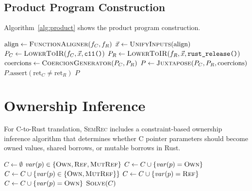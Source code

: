 \documentclass[11pt,a4paper]{article}
\begin{document}
\begin{appendices}
\subsection{Product Program Construction}

Algorithm~\ref{alg:product} shows the product program construction.

\begin{algorithm}[h]
\caption{Product Program Construction}\label{alg:product}
\begin{algorithmic}[1]
  \State $\text{align} \gets \Call{FunctionAligner}{f_C, f_R}$
  \State $\vec{x} \gets \Call{UnifyInputs}{\text{align}}$
  \State $P_C \gets \Call{LowerToIR}{f_C, \vec{x}, \texttt{c11()}}$
  \State $P_R \gets \Call{LowerToIR}{f_R, \vec{x}, \texttt{rust\_release()}}$
  \State $\text{coercions} \gets \Call{CoercionGenerator}{P_C, P_R}$
  \State $P \gets \Call{Juxtapose}{P_C, P_R, \text{coercions}}$
  \State $P.\text{assert}(\text{ret}_C \neq \text{ret}_R)$
  \State \Return $P$
\EndProcedure
\end{algorithmic}
\end{algorithm}


\section{Ownership Inference}\label{app:ownership}

For C-to-Rust translation, \textsc{SemRec} includes a constraint-based
ownership inference algorithm that determines whether C pointer
parameters should become owned values, shared borrows, or mutable
borrows in Rust.

\begin{algorithm}[h]
\caption{Ownership Inference via Constraint Solving}\label{alg:ownership}
\begin{algorithmic}[1]
  \State $C \gets \emptyset$
    \State $\mathit{var}(p) \in \{\textsc{Own}, \textsc{Ref}, \textsc{MutRef}\}$
      \State $C \gets C \cup \{\mathit{var}(p) = \textsc{Own}\}$
      \State $C \gets C \cup \{\mathit{var}(p) \in \{\textsc{Own}, \textsc{MutRef}\}\}$
    \Else
      \State $C \gets C \cup \{\mathit{var}(p) = \textsc{Ref}\}$
    \EndIf
      \State $C \gets C \cup \{\mathit{var}(p) = \textsc{Own}\}$
    \EndIf
  \EndFor
  \State \Return $\Call{Solve}{C}$
\EndProcedure
\end{algorithmic}
\end{algorithm}



\end{appendices}
\end{document}
